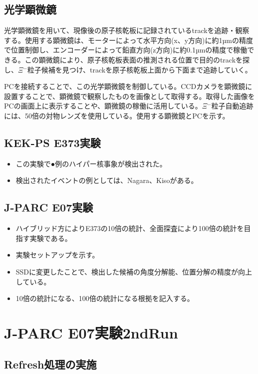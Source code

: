 \documentclass[12pt,a4paper]{jarticle}
\begin{document}
\subsection{光学顕微鏡}
光学顕微鏡を用いて、現像後の原子核乾板に記録されているtrackを追跡・観察する。使用する顕微鏡は、モーターによって水平方向(x、y方向)に約1µmの精度で位置制御し、エンコーダーによって鉛直方向(z方向)に約0.1µmの精度で稼働できる。この顕微鏡により、原子核乾板表面の推測される位置で目的のtrackを探し、$\Xi$$^-$粒子候補を見つけ、trackを原子核乾板上面から下面まで追跡していく。\par
PCを接続することで、この光学顕微鏡を制御している。CCDカメラを顕微鏡に設置することで、顕微鏡で観察したものを画像として取得する。取得した画像をPCの画面上に表示することや、顕微鏡の稼働に活用している。$\Xi$$^-$粒子自動追跡には、50倍の対物レンズを使用している。使用する顕微鏡とPCを示す。
\subsection{KEK-PS E373実験}
\begin{itemize}
    \item この実験で●例のハイパー核事象が検出された。
    \item 検出されたイベントの例としては、Nagara、Kisoがある。
\end{itemize}
\subsection{J-PARC E07実験}
\begin{itemize}
    \item ハイブリッド方によりE373の10倍の統計、全面探査により100倍の統計を目指す実験である。
    \item 実験セットアップを示す。
    \item SSDに変更したことで、検出した候補の角度分解能、位置分解の精度が向上している。
    \item 10倍の統計になる、100倍の統計になる根拠を記入する。
\end{itemize}

\newpage
\section{J-PARC E07実験2ndRun}
\subsection{Refresh処理の実施}
\end{document}
